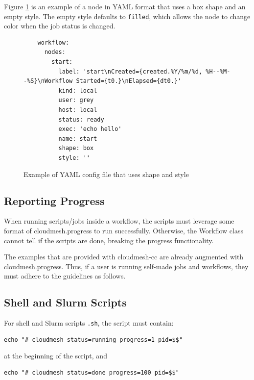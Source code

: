 Figure \ref{fig:shape-style-yaml} is an example of a node in YAML format that uses a box shape and an empty style. The empty style defaults to \texttt{filled}, which allows the node to change color when the job status is changed.

\begin{figure}
    \begin{verbatim}
    workflow:
      nodes:
        start:
          label: 'start\nCreated={created.%Y/%m/%d, %H--%M--%S}\nWorkflow Started={t0.}\nElapsed={dt0.}'
          kind: local
          user: grey
          host: local
          status: ready
          exec: 'echo hello'
          name: start
          shape: box
          style: ''
    \end{verbatim}
    \caption{Example of YAML config file that uses shape and style}
    \label{fig:shape-style-yaml}
\end{figure}



\subsection{Reporting Progress}\label{reporting-progress}

When running scripts/jobs inside a workflow, the scripts must leverage
some format of cloudmesh.progress to run successfully. Otherwise, the
Workflow class cannot tell if the scripts are done, breaking the
progress functionality.

The examples that are provided with cloudmesh-cc are already augmented
with cloudmesh.progress. Thus, if a user is running self-made jobs and
workflows, they must adhere to the guidelines as follows.

\subsection{Shell and Slurm Scripts}\label{shell-and-slurm-scripts}

For shell and Slurm scripts \texttt{.sh}, the script must contain:

\begin{verbatim}
echo "# cloudmesh status=running progress=1 pid=$$"
\end{verbatim}

at the beginning of the script, and

\begin{verbatim}
echo "# cloudmesh status=done progress=100 pid=$$"
\end{verbatim}

